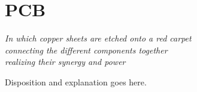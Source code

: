 \chapter{PCB}\label{ch:pcb}

\begin{flushright}{\slshape
    In which copper sheets are etched onto a red carpet\\
    connecting the different components together\\
    realizing their synergy and power
}
\end{flushright}

Disposition and explanation goes here. 


%



%



